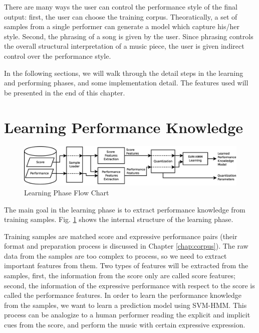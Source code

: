 There are many ways the user can control the performance style of the final output: first, the user can choose the training corpus. Theoratically, a set of samples from a single performer can generate a model which capture his/her style. Second, the phrasing of a song is given by the user. Since phrasing controls the overall structural interpretation of a music piece, the user is given indirect control over the performance style.


In the following sections, we will walk through the detail steps in the learning and performing phases, and some implementation detail. The features used will be presented in the end of this chapter.



\section{Learning Performance Knowledge}
\label{sec:learn}
\begin{figure}[tp]
   \begin{center}
      \includegraphics[width=\textwidth]{fig/learn_arch}
   \end{center}
   \caption{Learning Phase Flow Chart} 
   \label{fig:learnflow}
\end{figure}
The main goal in the learning phase is to extract performance knowledge from training samples. Fig. \ref{fig:learnflow} shows the internal structure of the learning phase.

   Training samples are matched score and expressive performance pairs (their format and preparation process is discussed in Chapter \ref{chap:corpus}). The raw data from the samples are too complex to process, so we need to extract important features from them. Two types of features will be extracted from the samples, first, the information from the score only are called score features; second, the information of the expressive performance with respect to the score is called the performance features. In order to learn the performance knowledge from the samples, we want to learn a prediction model using SVM-HMM. This process can be analogize to a human performer reading the explicit and implicit cues from the score, and perform the music with certain expressive expression. 


